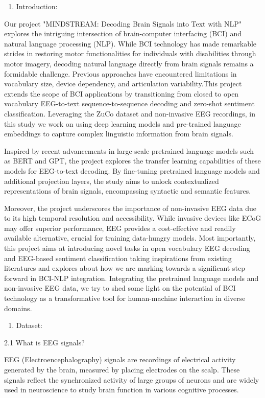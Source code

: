 \documentclass[11pt]{article}
\begin{document}
\begin{enumerate}
\item Introduction:
\end{enumerate}
\begin{justify}
Our project "MINDSTREAM: Decoding Brain Signals into Text with NLP" explores the intriguing intersection of brain-computer interfacing (BCI) and natural language processing (NLP). While BCI technology has made remarkable strides in restoring motor functionalities for individuals with disabilities through motor imagery, decoding natural language directly from brain signals remains a formidable challenge. Previous approaches have encountered limitations in vocabulary size, device dependency, and articulation variability.This project extends the scope of BCI applications by transitioning from closed to open vocabulary EEG-to-text sequence-to-sequence decoding and zero-shot sentiment classification. Leveraging the ZuCo dataset and non-invasive EEG recordings, in this study we work on using deep learning models and pre-trained language embeddings to capture complex linguistic information from brain signals.

Inspired by recent advancements in large-scale pretrained language models such as BERT and GPT, the project explores the transfer learning capabilities of these models for EEG-to-text decoding. By fine-tuning pretrained language models and additional projection layers, the study aims to unlock contextualized representations of brain signals, encompassing syntactic and semantic features.

Moreover, the project underscores the importance of non-invasive EEG data due to its high temporal resolution and accessibility. While invasive devices like ECoG may offer superior performance, EEG provides a cost-effective and readily available alternative, crucial for training data-hungry models. Most importantly, this project aims at introducing novel tasks in open vocabulary EEG decoding and EEG-based sentiment classification taking inspirations from existing literatures and explores about how we are  marking towards a significant step forward in BCI-NLP integration. Integrating the  pretrained language models and non-invasive EEG data, we try to shed some light on the potential of BCI technology as a transformative tool for human-machine interaction in diverse domains.

\end{justify}

\begin{enumerate}
\item Dataset:
\end{enumerate}
2.1 What is EEG signals?
\begin{justify}
EEG (Electroencephalography) signals are recordings of electrical activity generated by the brain, measured by placing electrodes on the scalp. These signals reflect the synchronized activity of large groups of neurons and are widely used in neuroscience to study brain function in various cognitive processes.
\end{justify}
\end{document}
